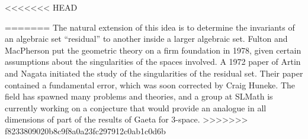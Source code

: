 \documentclass[11pt, oneside]{article}   	%
\begin{document}
<<<<<<< HEAD




=======
The natural extension of this idea is to determine the invariants of an algebraic set ``residual'' to another inside a larger algebraic set. Fulton and MacPherson put the geometric theory on a firm foundation in 1978, given certain assumptions about the singularities of the spaces involved. A 1972 paper of Artin and Nagata initiated the study of the singularities of the residual set. Their paper contained a fundamental error, which was soon corrected by Craig Huneke. The field has spawned many problems and theories, and a group at SLMath is currently working on a conjecture that would provide an analogue in all dimensions of part of the results of Gaeta for 3-space.
>>>>>>> f8233809020b8c9f8a0a23fc297912c0ab1c0d6b
\end{document}
